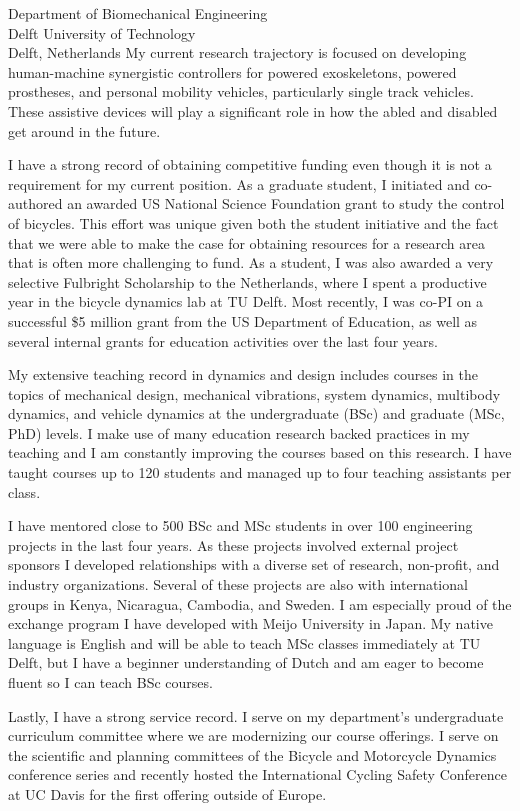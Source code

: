 \documentclass{letter}
\begin{document}
\begin{letter}{
  Department of Biomechanical Engineering \\
  Delft University of Technology \\
  Delft, Netherlands
}
My current research trajectory is focused on developing human-machine
synergistic controllers for powered exoskeletons, powered prostheses, and
personal mobility vehicles, particularly single track vehicles. These assistive
devices will play a significant role in how the abled and disabled get around
in the future.

I have a strong record of obtaining competitive funding even though it is not a
requirement for my current position. As a graduate student, I initiated and
co-authored an awarded US National Science Foundation grant to study the
control of bicycles. This effort was unique given both the student initiative
and the fact that we were able to make the case for obtaining resources for a
research area that is often more challenging to fund. As a student, I was also
awarded a very selective Fulbright Scholarship to the Netherlands, where I
spent a productive year in the bicycle dynamics lab at TU Delft. Most recently,
I was co-PI on a successful \$5 million grant from the US Department of
Education, as well as several internal grants for education activities over the
last four years.

My extensive teaching record in dynamics and design includes courses in the
topics of mechanical design, mechanical vibrations, system dynamics, multibody
dynamics, and vehicle dynamics at the undergraduate (BSc) and graduate (MSc,
PhD) levels. I make use of many education research backed practices in my
teaching and I am constantly improving the courses based on this research. I
have taught courses up to 120 students and managed up to four teaching
assistants per class.

I have mentored close to 500 BSc and MSc students in over 100 engineering
projects in the last four years.  As these projects involved external project
sponsors I developed relationships with a diverse set of research, non-profit,
and industry organizations.  Several of these projects are also with
international groups in Kenya, Nicaragua, Cambodia, and Sweden. I am especially
proud of the exchange program I have developed with Meijo University in Japan.
My native language is English and will be able to teach MSc classes immediately
at TU Delft, but I have a beginner understanding of Dutch and am eager to
become fluent so I can teach BSc courses.

Lastly, I have a strong service record. I serve on my department's
undergraduate curriculum committee where we are modernizing our course
offerings. I serve on the scientific and planning committees of the Bicycle and
Motorcycle Dynamics conference series and recently hosted the International
Cycling Safety Conference at UC Davis for the first offering outside of Europe.


\end{letter}
\end{document}
